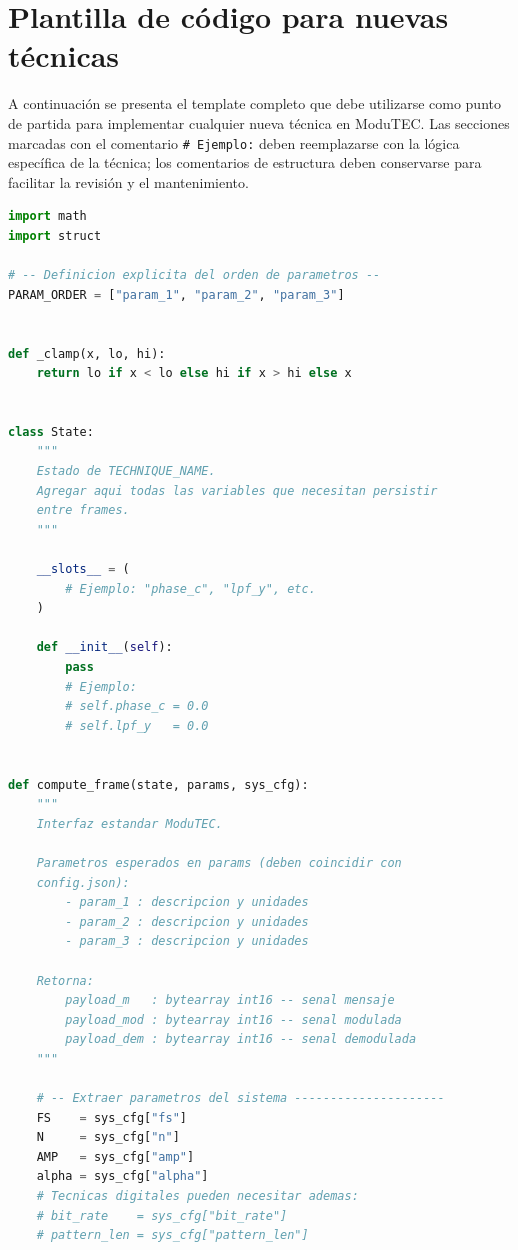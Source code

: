 \documentclass[12pt,letterpaper]{report}
\begin{document}
\appendix
\chapter{Plantilla de código para nuevas técnicas}
\label{ap:template}

A continuación se presenta el template completo que debe utilizarse como punto de partida
para implementar cualquier nueva técnica en ModuTEC. Las secciones marcadas con el comentario
\texttt{\# Ejemplo:} deben reemplazarse con la lógica específica de la técnica; los
comentarios de estructura deben conservarse para facilitar la revisión y el mantenimiento.

\begin{lstlisting}[language=Python, caption={TECHNIQUE\_NAME.py - Template}]
import math
import struct

# -- Definicion explicita del orden de parametros --
PARAM_ORDER = ["param_1", "param_2", "param_3"]


def _clamp(x, lo, hi):
    return lo if x < lo else hi if x > hi else x


class State:
    """
    Estado de TECHNIQUE_NAME.
    Agregar aqui todas las variables que necesitan persistir
    entre frames.
    """

    __slots__ = (
        # Ejemplo: "phase_c", "lpf_y", etc.
    )

    def __init__(self):
        pass
        # Ejemplo:
        # self.phase_c = 0.0
        # self.lpf_y   = 0.0


def compute_frame(state, params, sys_cfg):
    """
    Interfaz estandar ModuTEC.

    Parametros esperados en params (deben coincidir con
    config.json):
        - param_1 : descripcion y unidades
        - param_2 : descripcion y unidades
        - param_3 : descripcion y unidades

    Retorna:
        payload_m   : bytearray int16 -- senal mensaje
        payload_mod : bytearray int16 -- senal modulada
        payload_dem : bytearray int16 -- senal demodulada
    """

    # -- Extraer parametros del sistema ---------------------
    FS    = sys_cfg["fs"]
    N     = sys_cfg["n"]
    AMP   = sys_cfg["amp"]
    alpha = sys_cfg["alpha"]
    # Tecnicas digitales pueden necesitar ademas:
    # bit_rate    = sys_cfg["bit_rate"]
    # pattern_len = sys_cfg["pattern_len"]


\end{lstlisting}
\end{document}
